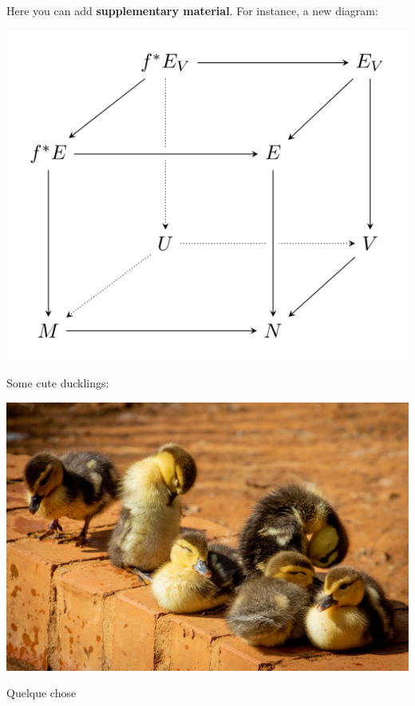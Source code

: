 \documentclass[a0paper,fleqn]{better_poster/betterposter}
\begin{document}
{}{

Here you can add \textbf{supplementary material}. For instance, a new diagram:
\begin{center}
\includegraphics[width=\textwidth]{img/tikzexample2}
\end{center}

Some cute ducklings:
\begin{center}
\includegraphics[width=\textwidth]{img/ducklings}
\end{center}
Quelque chose
\printbibliography

}
\end{document}

